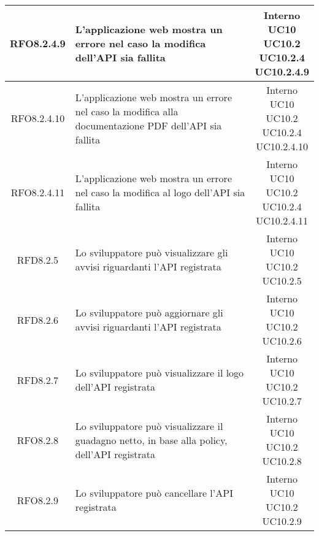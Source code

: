 \begin{longtable}{|c|p{8cm}|c|}
\hypertarget{RFO8.2.4.9}{RFO8.2.4.9} & L'applicazione web mostra un errore nel caso la modifica dell'API sia fallita & \makecell*{Interno\\UC10\\UC10.2\\UC10.2.4\\UC10.2.4.9} \\
\hline
\hypertarget{RFO8.2.4.10}{RFO8.2.4.10} & L'applicazione web mostra un errore nel caso la modifica alla documentazione PDF dell'API sia fallita & \makecell*{Interno\\UC10\\UC10.2\\UC10.2.4\\UC10.2.4.10} \\
\hline
\hypertarget{RFO8.2.4.11}{RFO8.2.4.11} & L'applicazione web mostra un errore nel caso la modifica al logo dell'API sia fallita & \makecell*{Interno\\UC10\\UC10.2\\UC10.2.4\\UC10.2.4.11} \\
\hline

\hypertarget{RFD8.2.5}{RFD8.2.5} & Lo sviluppatore può visualizzare gli avvisi riguardanti l'API registrata & \makecell*{Interno\\UC10\\UC10.2\\UC10.2.5} \\
\hline
\hypertarget{RFD8.2.6}{RFD8.2.6} & Lo sviluppatore può aggiornare gli avvisi riguardanti l'API registrata & \makecell*{Interno\\UC10\\UC10.2\\UC10.2.6} \\
\hline
\hypertarget{RFD8.2.7}{RFD8.2.7} & Lo sviluppatore può visualizzare il logo dell'API registrata & \makecell*{Interno\\UC10\\UC10.2\\UC10.2.7} \\
\hline
\hypertarget{RFO8.2.8}{RFO8.2.8} & Lo sviluppatore può visualizzare il guadagno netto, in base alla policy, dell'API registrata & \makecell*{Interno\\UC10\\UC10.2\\UC10.2.8} \\
\hline

\hypertarget{RFO8.2.9}{RFO8.2.9} & Lo sviluppatore può cancellare l'API registrata & \makecell*{Interno\\UC10\\UC10.2\\UC10.2.9} \\
\hline


\end{longtable}
